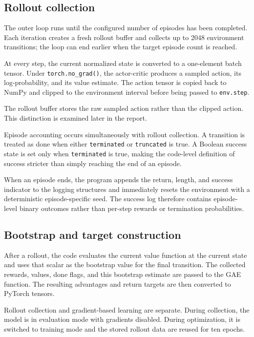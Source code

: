 \documentclass[11pt,a4paper]{article}
\begin{document}
\subsection{Rollout collection}
The outer loop runs until the configured number of episodes has been completed. Each iteration creates a fresh rollout buffer and collects up to 2048 environment transitions; the loop can end earlier when the target episode count is reached.

At every step, the current normalized state is converted to a one-element batch tensor. Under \texttt{torch.no\_grad()}, the actor-critic produces a sampled action, its log-probability, and its value estimate. The action tensor is copied back to NumPy and clipped to the environment interval before being passed to \texttt{env.step}.

The rollout buffer stores the raw sampled action rather than the clipped action. This distinction is examined later in the report.

Episode accounting occurs simultaneously with rollout collection. A transition is treated as done when either \texttt{terminated} or \texttt{truncated} is true. A Boolean success state is set only when \texttt{terminated} is true, making the code-level definition of success stricter than simply reaching the end of an episode.

When an episode ends, the program appends the return, length, and success indicator to the logging structures and immediately resets the environment with a deterministic episode-specific seed. The success log therefore contains episode-level binary outcomes rather than per-step rewards or termination probabilities.

\subsection{Bootstrap and target construction}
After a rollout, the code evaluates the current value function at the current state and uses that scalar as the bootstrap value for the final transition. The collected rewards, values, done flags, and this bootstrap estimate are passed to the GAE function. The resulting advantages and return targets are then converted to PyTorch tensors.

Rollout collection and gradient-based learning are separate. During collection, the model is in evaluation mode with gradients disabled. During optimization, it is switched to training mode and the stored rollout data are reused for ten epochs.
\end{document}
